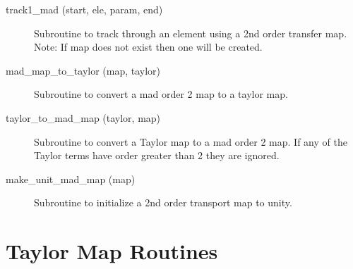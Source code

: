 \begin{description}
\item[track1_mad (start, ele, param, end)] \Newline 
     Subroutine to track through an element using a 2nd order transfer map.
     Note: If map does not exist then one will be created. 

\item[mad_map_to_taylor (map, taylor)] \Newline 
     Subroutine to convert a mad order 2 map to a taylor map.

\item[taylor_to_mad_map (taylor, map)] \Newline 
     Subroutine to convert a Taylor map to a mad order 2 map.
     If any of the Taylor terms have order greater than 2 they are ignored.

\item[make_unit_mad_map (map)] \Newline 
     Subroutine to initialize a 2nd order transport map to unity.


\end{description}

\section{Taylor Map Routines}
\label{r:taylor}   

